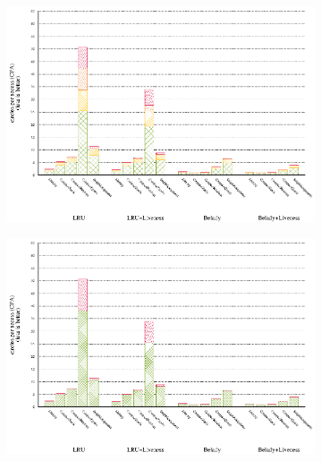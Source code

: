 \documentclass[onecolumn, openright, master, english, signatures]{dbrgrptt}
\begin{document}
\begin{figure}[!ht]
  \begin{subfigure}[b]{0.5\textwidth}%
    \includegraphics[width=\textwidth]{figs/plots/perf-richards.eps}
  \end{subfigure}%
  \begin{subfigure}[b]{0.5\textwidth}%
    \includegraphics[width=\textwidth]{figs/plots/perf-misses-richards.eps}
  \end{subfigure}%
  \caption{}
  \label{fig:todo}
\end{figure}
\end{document}
